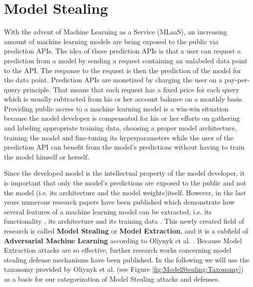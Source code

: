 \section{Model Stealing}
\label{sec:ModelStealing}
With the advent of Machine Learning as a Service (MLaaS), an increasing amount of machine learning models are being exposed to the public via 
prediction APIs. The idea of these prediction APIs is that a user can request a prediction from a model by sending a request containing an unlabeled data
point to the API. The response to the request is then the prediction of the model for the data point. Prediction APIs are monetized by charging the user
on a pay-per-query principle. That means that each request has a fixed price for each query which is usually subtracted from his or her account balance on
a monthly basis. Providing public access to a machine learning model is a win-win situation because the model developer is compensated for his or her efforts
on gathering and labeling appropriate training data, choosing a proper model architecture, training the model and fine-tuning its hyperparameters while the user
of the prediction API can benefit from the model's predictions without having to train the model himself or herself. \par
Since the developed model is the intellectual property of the model developer, it is important that only the model's predictions are exposed to the public and
not the model (i.e. its architecture and the model weights)itself. However, in the last years numerous research papers have been published which demonstrate how
several features of a machine learning model can be extracted, i.e. its functionality \cite{tramer2016stealing}, its architecture \cite{oh2019towards} and its
training data \cite{shokri2017membership}. This newly created field of research is called \textbf{Model Stealing} or \textbf{Model Extraction}, and it is a subfield
of \textbf{Adversarial Machine Learning} according to Oliynyk et al. \cite{oliynyk2022know}. Because Model Extraction attacks are so effective, further research works
concerning model stealing defense mechanisms have been published. In the following we will use the taxonomy provided by Oliynyk et al. (see Figure 
\ref{fig:ModelStealing:Taxonomy}) \cite{oliynyk2022know} as a basis for our categorization of Model Stealing attacks and defenses.

